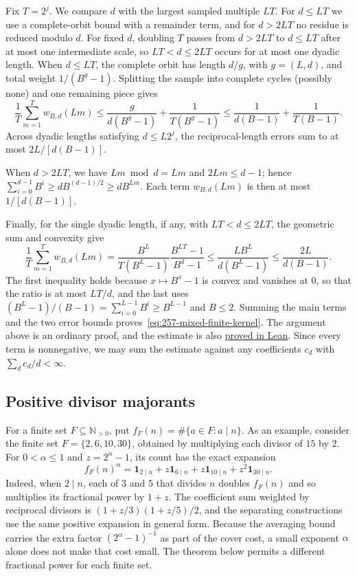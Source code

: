 \documentclass[11pt]{article}
\theoremstyle{plain}
\theoremstyle{definition}
\theoremstyle{remark}
\newcommand{\Npos}{\mathbb{N}_{>0}}
\begin{document}
Fix $T=2^j$. We compare $d$ with the largest sampled multiple $LT$.
For $d\le LT$ we use a complete-orbit bound with a remainder term, and
for $d>2LT$ no residue is reduced modulo $d$. For fixed $d$, doubling
$T$ passes from $d>2LT$ to $d\le LT$ after at most one intermediate
scale, so $LT<d\le2LT$ occurs for at most one dyadic length.
When $d\le LT$, the complete orbit has length $d/g$, with $g=(L,d)$,
and total weight $1/(B^g-1)$. Splitting the sample into complete
cycles (possibly none) and one remaining piece gives
\[
 \frac1T\sum_{m=1}^T w_{B,d}(Lm)
 \le\frac{g}{d(B^g-1)}+\frac1{T(B^g-1)}
 \le\frac1{d(B-1)}+\frac1{T(B-1)}.
\]
Across dyadic lengths satisfying $d\le L2^j$, the reciprocal-length
errors sum to at most $2L/[d(B-1)]$.
\par
\begin{samepage}
\noindent
When $d>2LT$, we have $Lm\bmod d=Lm$ and $2Lm\le d-1$; hence
$\sum_{i=0}^{d-1}B^i\ge dB^{(d-1)/2}\ge dB^{Lm}$.
Each term $w_{B,d}(Lm)$ is then at most $1/[d(B-1)]$.
\par
\end{samepage}
Finally, for the single dyadic length, if any, with $LT<d\le2LT$, the
geometric sum and convexity give
\[
 \frac1T\sum_{m=1}^T w_{B,d}(Lm)
 =\frac{B^L}{T(B^L-1)}\frac{B^{LT}-1}{B^d-1}
 \le\frac{LB^L}{d(B^L-1)}
 \le\frac{2L}{d(B-1)}.
\]
The first inequality holds because $x\mapsto B^x-1$ is convex and
vanishes at $0$, so that the ratio is at most $LT/d$, and the last uses
$(B^L-1)/(B-1)=\sum_{i=0}^{L-1}B^i\ge B^{L-1}$ and $B\le2$.
Summing the main terms and the two error bounds proves~\eqref{eq:257-mixed-finite-kernel}.
The argument above is an ordinary proof, and the estimate is also
\href{https://github.com/wcook04/plectis-erdos/blob/c91562bd574a387cde904481e609c7b4cacebb14/lean/ErdosProblems/Erdos257/PaperCompleteR8/DyadicKernel.lean\#L206}{proved in Lean}.
Since every term is nonnegative, we may sum the estimate against any
coefficients $c_d$ with $\sum_dc_d/d<\infty$.

\subsection{Positive divisor majorants}
For a finite set $F\subseteq\Npos$, put
$f_F(n)=\#\{a\in F:a\mid n\}$. As an example, consider the finite set
$F=\{2,6,10,30\}$, obtained by multiplying each divisor of $15$ by $2$.
For $0<\alpha\le1$
and $z=2^\alpha-1$, its count has the exact expansion
\[
 f_F(n)^\alpha
 =\mathbf1_{2\mid n}+z\mathbf1_{6\mid n}
  +z\mathbf1_{10\mid n}+z^2\mathbf1_{30\mid n}.
\]
Indeed, when $2\mid n$, each of $3$ and $5$ that divides $n$ doubles
$f_F(n)$ and so multiplies its fractional power by $1+z$. The
coefficient sum weighted by reciprocal divisors is $(1+z/3)(1+z/5)/2$,
and the separating constructions use the same positive expansion in
general form. Because the averaging bound carries the extra factor
$(2^\alpha-1)^{-1}$ as part of the cover cost, a small exponent $\alpha$
alone does not make that cost small. The theorem below permits a
different fractional power for each finite set.
\end{document}
